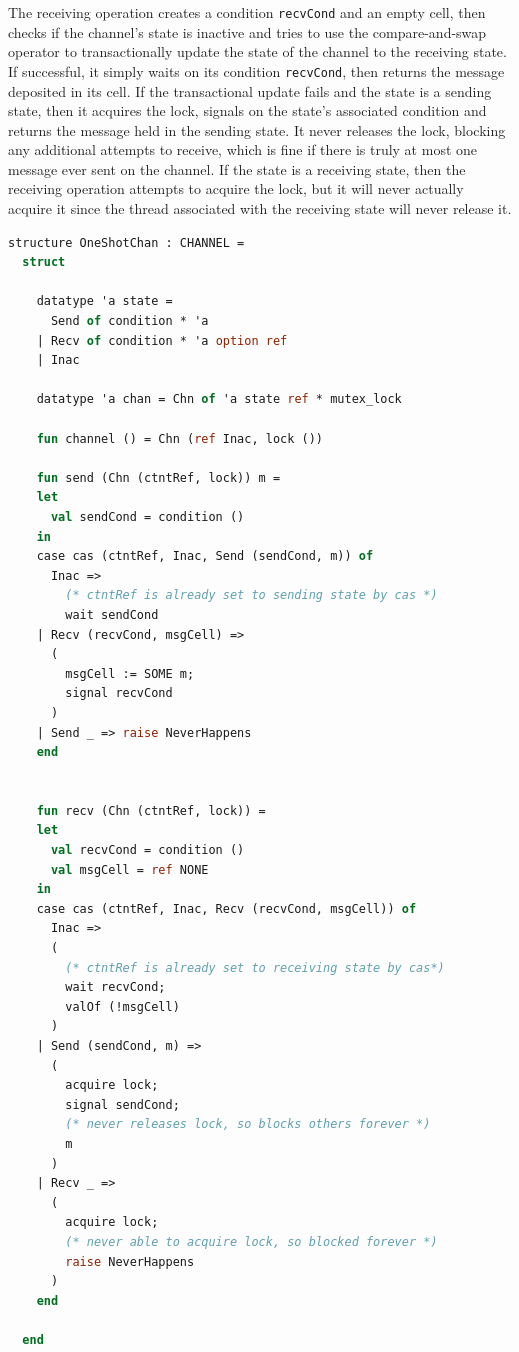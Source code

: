 \documentclass[letterpaper, 11pt]{extarticle}
\begin{document}
The receiving operation creates a condition \lstinline{recvCond} and an empty cell,
then checks if the channel's state is inactive and tries to use the
compare-and-swap operator to transactionally update the state of the channel to
the receiving state. If successful, it simply waits on its condition \lstinline{recvCond},
then returns the message deposited in its cell.
If the transactional update fails and the state is a sending state,
then it acquires the lock, signals on the state's associated condition and returns the message
held in the sending state. It never releases the lock, blocking any additional attempts to receive,
which is fine if there is truly at most one message ever sent on the channel.
If the state is a receiving state, then the receiving operation attempts to acquire the lock,
but it will never actually acquire it since the thread associated with the receiving state will
never release it.


\begin{lstlisting}[language=ML, mathescape]
  structure OneShotChan : CHANNEL =
  struct

    datatype 'a state =
      Send of condition * 'a
    | Recv of condition * 'a option ref
    | Inac  

    datatype 'a chan = Chn of 'a state ref * mutex_lock

    fun channel () = Chn (ref Inac, lock ())

    fun send (Chn (ctntRef, lock)) m =
    let
      val sendCond = condition ()
    in
    case cas (ctntRef, Inac, Send (sendCond, m)) of
      Inac =>
        (* ctntRef is already set to sending state by cas *)
        wait sendCond
    | Recv (recvCond, msgCell) =>
      (
        msgCell := SOME m;
        signal recvCond
      )
    | Send _ => raise NeverHappens
    end


    fun recv (Chn (ctntRef, lock)) =
    let
      val recvCond = condition ()
      val msgCell = ref NONE 
    in
    case cas (ctntRef, Inac, Recv (recvCond, msgCell)) of
      Inac =>
      (
        (* ctntRef is already set to receiving state by cas*)
        wait recvCond;
        valOf (!msgCell)
      )
    | Send (sendCond, m) =>
      (
        acquire lock;
        signal sendCond;
        (* never releases lock, so blocks others forever *)
        m
      )
    | Recv _ =>
      (
        acquire lock;
        (* never able to acquire lock, so blocked forever *)
        raise NeverHappens
      )
    end

  end
\end{lstlisting}
\end{document}
